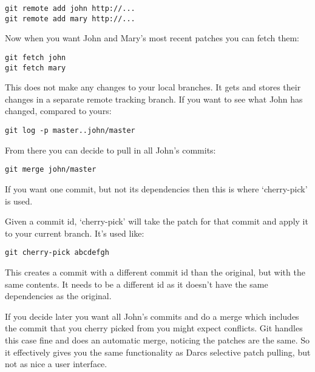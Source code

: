 \begin{verbatim}
git remote add john http://...
git remote add mary http://...
\end{verbatim}

Now when you want John and Mary's most recent patches you can fetch
them:

\begin{verbatim}
git fetch john
git fetch mary
\end{verbatim}

This does not make any changes to your local branches. It gets and
stores their changes in a separate remote tracking branch. If you want
to see what John has changed, compared to yours:

\begin{verbatim}
git log -p master..john/master
\end{verbatim}

From there you can decide to pull in all John's commits:

\begin{verbatim}
git merge john/master
\end{verbatim}

If you want one commit, but not its dependencies then this is where
`cherry-pick' is used.

Given a commit id, `cherry-pick' will take the patch for that commit
and apply it to your current branch. It's used like:

\begin{verbatim}
git cherry-pick abcdefgh
\end{verbatim}

This creates a commit with a different commit id than the original,
but with the same contents. It needs to be a different id as it
doesn't have the same dependencies as the original.

If you decide later you want all John's commits and do a merge which
includes the commit that you cherry picked from you might expect
conflicts. Git handles this case fine and does an automatic merge,
noticing the patches are the same. So it effectively gives you the
same functionality as Darcs selective patch pulling, but not as nice a
user interface.
